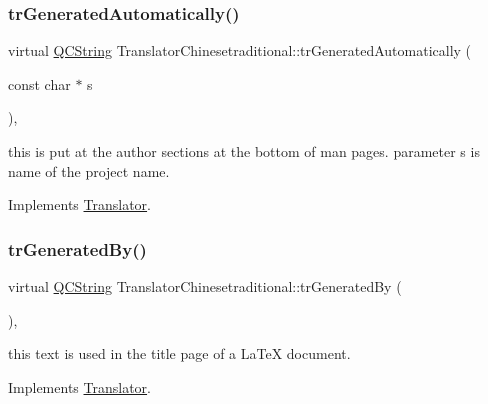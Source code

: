 \subsubsection{\texorpdfstring{trGeneratedAutomatically()}{trGeneratedAutomatically()}}
{\footnotesize\ttfamily virtual \mbox{\hyperlink{class_q_c_string}{Q\+C\+String}} Translator\+Chinesetraditional\+::tr\+Generated\+Automatically (\begin{DoxyParamCaption}\item[{const char $\ast$}]{s }\end{DoxyParamCaption})\hspace{0.3cm}{\ttfamily [inline]}, {\ttfamily [virtual]}}

this is put at the author sections at the bottom of man pages. parameter s is name of the project name. 

Implements \mbox{\hyperlink{class_translator}{Translator}}.

\mbox{\label{class_translator_chinesetraditional_aeb5bb752c5fd1b1338aa6da084c65caa}} 
\subsubsection{\texorpdfstring{trGeneratedBy()}{trGeneratedBy()}}
{\footnotesize\ttfamily virtual \mbox{\hyperlink{class_q_c_string}{Q\+C\+String}} Translator\+Chinesetraditional\+::tr\+Generated\+By (\begin{DoxyParamCaption}{ }\end{DoxyParamCaption})\hspace{0.3cm}{\ttfamily [inline]}, {\ttfamily [virtual]}}

this text is used in the title page of a La\+TeX document. 

Implements \mbox{\hyperlink{class_translator}{Translator}}.

\mbox{\label{class_translator_chinesetraditional_a2409b760dbc895ccd60b3d2c13c532b9}} 
